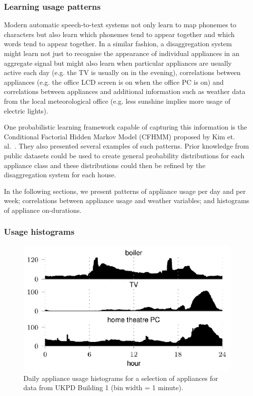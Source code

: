 \documentclass{sig-alternate}
\begin{document}
\subsubsection{Learning usage patterns}

\noindent
Modern automatic speech-to-text systems not only learn to map phonemes
to characters but also learn which phonemes tend to appear together
and which words tend to appear together.  In a similar fashion, a
disaggregation system might learn not just to recognise the appearance
of individual appliances in an aggregate signal but might also learn
when particular appliances are usually active each day (e.g. the TV is
usually on in the evening), correlations between appliances (e.g. the
office LCD screen is on when the office PC is on) and correlations
between appliances and additional information such as weather data
from the local meteorological office (e.g. less sunshine implies more
usage of electric lights).

One probabilistic learning framework capable of capturing this
information is the Conditional Factorial Hidden Markov Model (CFHMM)
proposed by Kim et. al.~\cite{kim_2011}. They also presented
several examples of such patterns.  Prior knowledge from
public datasets could be used to create general probability
distributions for each appliance class and these distributions could
then be refined by the disaggregation system for each house.

In the following sections, we present patterns of appliance usage per
day and per week; correlations between appliance usage and weather
variables; and histograms of appliance on-durations. 

\subsubsection{Usage histograms}

\begin{figure}[!t]
  \centering
  \includegraphics[width=\columnwidth]{figures/daily_usage_histograms2.pdf}
  \caption{Daily appliance usage histograms for a selection of
    appliances for data from UKPD Building 1 (bin width = 1 minute).}
  \label{fig:daily_usage_histograms}
\end{figure} 
\end{document}

